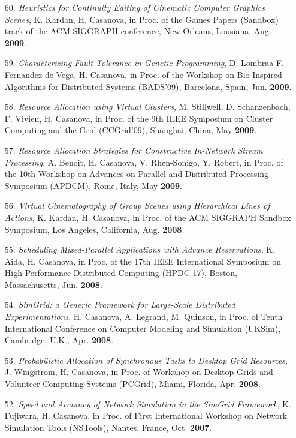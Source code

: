 \begin{enumerate}
\item[60.] {\it Heuristics for Continuity Editing of Cinematic Computer
Graphics Scenes}, K. Kardan, H. Casanova, in Proc. of the Games
Papers (Sandbox) track of the ACM SIGGRAPH conference, New Orleans,
Lousiana, Aug. {\bf 2009}.

\item[59.] {\it Characterizing Fault Tolerance in Genetic Programming},
D. Lombraa F. Fernandez de Vega, H. Casanova, in Proc. of the
Workshop on Bio-Inspired Algorithms for Distributed Systems (BADS'09),
Barcelona, Spain, Jun. {\bf 2009}. 

\item[58.] {\it Resource Allocation using Virtual Clusters}, M. Stillwell,
D. Schanzenbach, F. Vivien, H. Casanova, in Proc. of the 9th IEEE
Symposium on Cluster Computing and the Grid (CCGrid'09), Shanghai, China,
May {\bf 2009}.

\item[57.] {\it  Resource Allocation Strategies for Constructive In-Network
Stream Processing}, A. Benoit, H. Casanova, V. Rhen-Sonigo, Y. Robert, in
Proc. of the 10th Workshop on Advances on Parallel and Distributed
Processing Symposium (APDCM), Rome, Italy, May {\bf 2009}.

\item[56.] {\it Virtual Cinematography of Group Scenes using Hierarchical Lines
of Actions}, K. Kardan, H. Casanova, in Proc. of the ACM SIGGRAPH Sandbox
Symposium, Los Angeles, California, Aug. {\bf 2008}.

\item[55.] {\it Scheduling Mixed-Parallel Applications with Advance
Reservations}, K. Aida, H. Casanova, in Proc. of the 17th IEEE
International Symposium on High Performance Distributed Computing
(HPDC-17), Boston, Massachusetts, Jun. {\bf 2008}.

\item[54.] {\it SimGrid: a Generic Framework for Large-Scale Distributed Experimentations}, H. Casanova, A. Legrand, M. Quinson, in Proc. of Tenth International Conference on Computer Modeling and Simulation (UKSim), Cambridge, U.K., Apr. {\bf 2008}.

\item[53.] {\it Probabilistic Allocation of Synchronous Tasks to Desktop Grid
Resources}, J. Wingstrom, H. Casanova, in Proc. of Workshop on Desktop
Grids and Volunteer Computing Systems (PCGrid), Miami, Florida, Apr. {\bf
2008}.

\item[52.] {\it Speed and Accuracy of Network Simulation in the SimGrid
Framework}, K. Fujiwara, H. Casanova, in Proc. of First International
Workshop on Network Simulation Tools (NSTools), Nantes, France, Oct. {\bf
2007}.


\end{enumerate}
